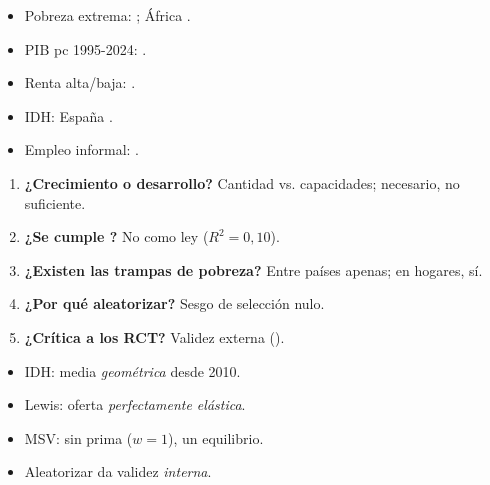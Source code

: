 \documentclass{article}
\begin{document}
\begin{columnas}
\anexorepaso
{}
\begin{itemize}
\item Pobreza extrema: ; África .
\item PIB pc 1995-2024: .
\item Renta alta/baja: .
\item IDH: España .
\item Empleo informal: .
\end{itemize}
\begin{enumerate}
\item \textbf{¿Crecimiento o desarrollo?} Cantidad vs. capacidades; necesario, no suficiente.
\item \textbf{¿Se cumple ?} No como ley ($R^2=0{,}10$).
\item \textbf{¿Existen las trampas de pobreza?} Entre países apenas; en hogares, sí.
\item \textbf{¿Por qué aleatorizar?} Sesgo de selección nulo.
\item \textbf{¿Crítica a los RCT?} Validez externa ().
\end{enumerate}
\begin{trampa}
\begin{itemize}
\item IDH: media \emph{geométrica} desde 2010.
\item Lewis: oferta \emph{perfectamente elástica}.
\item MSV: sin prima ($w=1$), un equilibrio.
\item Aleatorizar da validez \emph{interna}.
\end{itemize}
\end{trampa}

\end{columnas}
\end{document}
